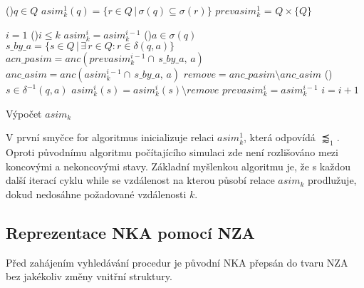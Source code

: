         \begin{algorithm}[h]
            \scriptsize
            \DontPrintSemicolon
            \setcounter{AlgoLine}{0}

            \vspace{0.2cm}

            \ForAll(){$q \in Q$}
            {
                $asim^1_k(q) = \{r \in Q\, |\, \sigma(q) \subseteq \sigma(r)\}$\;
            }
            $prevasim^1_k$ = $Q \times \{Q\}$\;

            \vspace{0.2cm}
            $i = 1$\;
            \While(){$i \leq k$}
            {
                $asim^i_k = asim^{i-1}_k$\;
                {
                    \ForAll(){$a \in \sigma(q)$}
                    {
                        $s\_by\_a = \{s \in Q\, |\, \exists\, r \in Q: r \in \delta(q, a)\}$\;
                        $acn\_pasim = anc(prevasim^{i-1}_k \cap\, s\_by\_a,\, a)$\;
                        $anc\_asim = anc(asim^{i-1}_k \cap\, s\_by\_a,\, a)$\;
                        $remove = anc\_pasim \setminus anc\_asim$\;
                        \ForAll(){$s \in \delta^{-1}(q, a)$}
                        {
                            $asim^i_k(s) = asim^i_k(s) \setminus remove$\;
                        }
                    }
                }
                $prevasim^i_k = asim^{i-1}_k$\;
                $i = i + 1$\;
            }

            \;

            \normalsize
            \caption{Výpočet $asim_k$}
            \label{aproxSim-Alg}
        \end{algorithm}

    V první smyčce for algoritmus inicializuje relaci $asim^1_k$, která odpovídá $\precapprox_1$. Oproti původnímu algoritmu počítajícího simulaci zde není rozlišováno mezi koncovými a nekoncovými stavy. Základní myšlenkou algoritmu je, že s každou další iterací cyklu while se vzdálenost na kterou působí relace $asim_k$ prodlužuje, dokud nedosáhne požadované vzdálenosti $k$.

    \subsection{Reprezentace NKA pomocí NZA}
        Před zahájením vyhledávání procedur je původní NKA přepsán do tvaru NZA bez jakékoliv změny vnitřní struktury.


